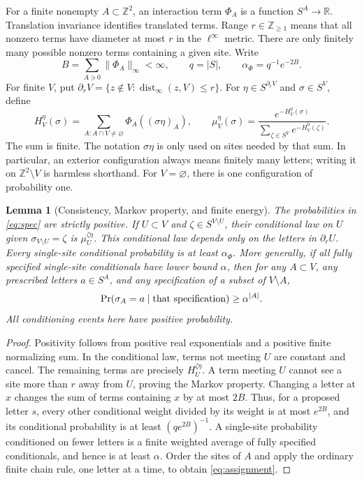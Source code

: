 \documentclass[11pt]{amsart}
\newtheorem{lemma}[theorem]{Lemma}
\theoremstyle{definition}
\newcommand{\Z}{\mathbb Z}
\newcommand{\R}{\mathbb R}
\newcommand{\dist}{\operatorname{dist}_\infty}
\newcommand{\1}{\mathbf 1}
\begin{document}
For a finite nonempty $A\subset\Z^2$, an interaction term $\Phi_A$ is a
function $S^A\to\R$. Translation invariance identifies translated terms.
Range $r\in\Z_{\ge1}$ means that all nonzero terms have diameter at most $r$
in the $\ell^\infty$ metric. There are only finitely many possible nonzero
terms containing a given site. Write
\begin{equation}\label{eq:B}
 B=\sum_{A\ni0}\|\Phi_A\|_\infty<\infty,
 \qquad q=|S|,\qquad \alpha_\Phi=q^{-1}e^{-2B}.
\end{equation}
For finite $V$, put
$\partial_r V=\{z\notin V:\dist(z,V)\le r\}$.
For $\eta\in S^{\partial_rV}$ and $\sigma\in S^V$, define
\begin{equation}\label{eq:spec}
 H_V^\eta(\sigma)=\sum_{A:A\cap V\ne\varnothing}
                 \Phi_A((\sigma\eta)_A),\qquad
 \mu_V^\eta(\sigma)=\frac{e^{-H_V^\eta(\sigma)}}
                    {\sum_{\zeta\in S^V}e^{-H_V^\eta(\zeta)}}.
\end{equation}
The sum is finite. The notation $\sigma\eta$ is only used on sites needed by
that sum. In particular, an exterior configuration always means finitely
many letters; writing it on $\Z^2\setminus V$ is harmless shorthand. For
$V=\varnothing$, there is one configuration of probability one.

\begin{lemma}[Consistency, Markov property, and finite energy]
\label{lem:spec}
The probabilities in \eqref{eq:spec} are strictly positive. If $U\subset V$
and $\zeta\in S^{V\setminus U}$, their conditional law on $U$ given
$\sigma_{V\setminus U}=\zeta$ is $\mu_U^{\zeta\eta}$. This conditional law
depends only on the letters in $\partial_rU$.
Every single-site conditional probability is at least $\alpha_\Phi$.
More generally, if all fully specified single-site conditionals have lower
bound $\alpha$, then for any $A\subset V$, any prescribed letters $a\in S^A$,
and any specification of a subset of $V\setminus A$,
\begin{equation}\label{eq:assignment}
 \Pr(\sigma_A=a\mid\hbox{that specification})\ge\alpha^{|A|}.
\end{equation}
All conditioning events here have positive probability.
\end{lemma}
\begin{proof}
Positivity follows from positive real exponentials and a positive finite
normalizing sum. In the conditional law, terms not meeting $U$ are constant
and cancel. The remaining terms are precisely $H_U^{\zeta\eta}$. A term
meeting $U$ cannot see a site more than $r$ away from $U$, proving the Markov
property. Changing a letter at $x$ changes the sum of terms containing $x$
by at most $2B$. Thus, for a proposed letter $s$, every other conditional
weight divided by its weight is at most $e^{2B}$, and its conditional
probability is at least $(qe^{2B})^{-1}$.
A single-site probability conditioned on fewer letters is a finite weighted
average of fully specified conditionals, and hence is at least $\alpha$.
Order the sites of $A$ and apply the ordinary finite chain rule, one letter
at a time, to obtain \eqref{eq:assignment}.
\end{proof}
\end{document}
